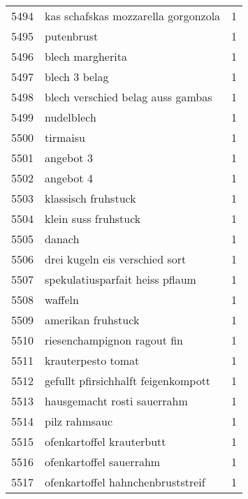 \begin{tabular}{llr}
5494 &                kas schafskas mozzarella gorgonzola &      1 \\
5495 &                                         putenbrust &      1 \\
5496 &                                   blech margherita &      1 \\
5497 &                                      blech 3 belag &      1 \\
5498 &                  blech verschied belag auss gambas &      1 \\
5499 &                                         nudelblech &      1 \\
5500 &                                           tirmaisu &      1 \\
5501 &                                          angebot 3 &      1 \\
5502 &                                          angebot 4 &      1 \\
5503 &                                klassisch fruhstuck &      1 \\
5504 &                               klein suss fruhstuck &      1 \\
5505 &                                             danach &      1 \\
5506 &                     drei kugeln eis verschied sort &      1 \\
5507 &                    spekulatiusparfait heiss pflaum &      1 \\
5508 &                                            waffeln &      1 \\
5509 &                                 amerikan fruhstuck &      1 \\
5510 &                        riesenchampignon ragout fin &      1 \\
5511 &                                 krauterpesto tomat &      1 \\
5512 &                gefullt pfirsichhalft feigenkompott &      1 \\
5513 &                        hausgemacht rosti sauerrahm &      1 \\
5514 &                                      pilz rahmsauc &      1 \\
5515 &                          ofenkartoffel krauterbutt &      1 \\
5516 &                            ofenkartoffel sauerrahm &      1 \\
5517 &                  ofenkartoffel hahnchenbruststreif &      1 \\

\end{tabular}
